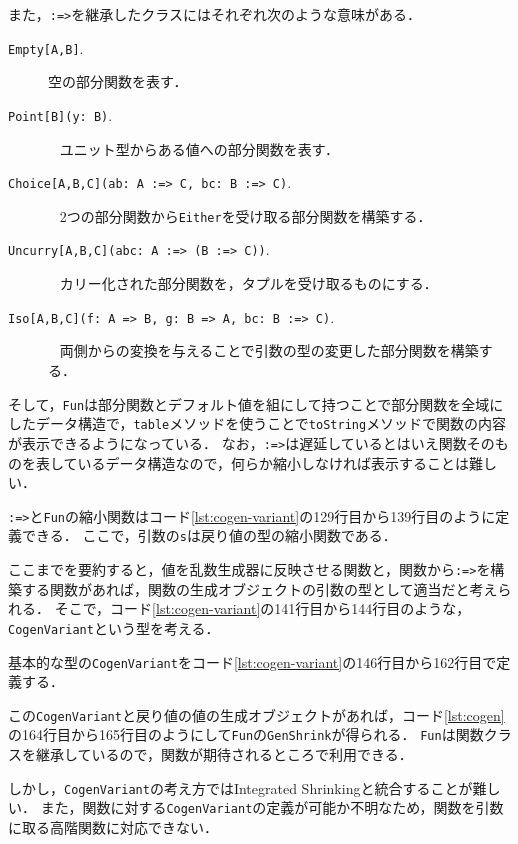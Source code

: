 \documentclass[submit,PRO]{ipsj}
\theoremstyle{definition}
\begin{document}
また，\texttt{:=>}を継承したクラスにはそれぞれ次のような意味がある．

\begin{description}
  \item[\texttt{Empty[A,B]}.] 空の部分関数を表す．
  \item[\texttt{Point[B](y:\ B)}.]~\newline
    ユニット型からある値への部分関数を表す．
  \item[\texttt{Choice[A,B,C](ab:\ A :=> C, bc:\ B :=> C)}.] ~\newline
    2つの部分関数から\texttt{Either}を受け取る部分関数を構築する．
  \item[\texttt{Uncurry[A,B,C](abc:\ A :=> (B :=> C))}.] ~\newline
    カリー化された部分関数を，タプルを受け取るものにする．
  \item[\texttt{Iso[A,B,C](f:\ A => B, g:\ B => A, bc:\ B :=> C)}.] ~\newline
    両側からの変換を与えることで引数の型の変更した部分関数を構築する．
\end{description}

そして，\texttt{Fun}は部分関数とデフォルト値を組にして持つことで部分関数を全域にしたデータ構造で，\texttt{table}メソッドを使うことで\texttt{toString}メソッドで関数の内容が表示できるようになっている．
なお，\texttt{:=>}は遅延しているとはいえ関数そのものを表しているデータ構造なので，何らか縮小しなければ表示することは難しい．

\texttt{:=>}と\texttt{Fun}の縮小関数はコード\ref{lst:cogen-variant}の129行目から139行目のように定義できる．
ここで，引数の\texttt{s}は戻り値の型の縮小関数である．

ここまでを要約すると，値を乱数生成器に反映させる関数と，関数から\texttt{:=>}を構築する関数があれば，関数の生成オブジェクトの引数の型として適当だと考えられる．
そこで，コード\ref{lst:cogen-variant}の141行目から144行目のような，\texttt{CogenVariant}という型を考える．

基本的な型の\texttt{CogenVariant}をコード\ref{lst:cogen-variant}の146行目から162行目で定義する．

この\texttt{CogenVariant}と戻り値の値の生成オブジェクトがあれば，コード\ref{lst:cogen}の164行目から165行目のようにして\texttt{Fun}の\texttt{GenShrink}が得られる．
\texttt{Fun}は関数クラスを継承しているので，関数が期待されるところで利用できる．

しかし，\texttt{CogenVariant}の考え方ではIntegrated Shrinkingと統合することが難しい．
また，関数に対する\texttt{CogenVariant}の定義が可能か不明なため，関数を引数に取る高階関数に対応できない．
\end{document}

